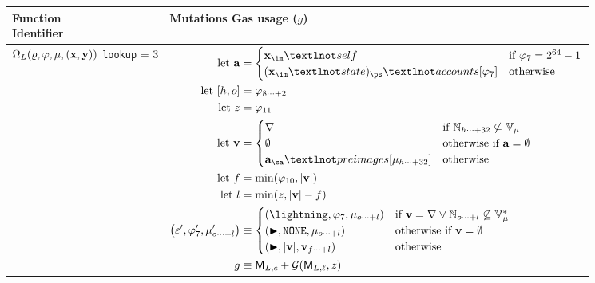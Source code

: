 \begin{longtable}{p{3cm} p{13cm}}
  \toprule
  \thead*{\textbf{Function} \\ \textbf{Identifier}} &
  \thead{\textbf{Mutations} \\ \textbf{Gas usage (}$g$\textbf{)}} \\
  \cmidrule(lr){1-1}\cmidrule(lr){2-2}
  \endhead
  \makecell*[l]{
  $\Omega_L(\gascounter, \registers, \memory, \imXY)$ \\
  \texttt{lookup} = 3} &
  $\begin{aligned}
    \using \mathbf{a} &= \begin{cases}
      \imX_\im¬self &\when \registers_7 = 2^{64} - 1 \\
      (\imX_\im¬state)_\ps¬accounts[\registers_7] &\otherwise
    \end{cases} \\
    \using \sq{h, o} &= \registers\subrange{8}{2} \\
    \using z &= \registers_{11} \\
    \using \mathbf{v} &= \begin{cases}
      \error &\when \Nrange{h}{32} \not\subseteq \readable{\memory} \\
      \none &\otherwhen \mathbf{a} = \none \\
      \mathbf{a}_\sa¬preimages[\memory\subrange{h}{32}] &\otherwise \\
    \end{cases} \\
    \using f &= \min(\registers_{10}, \len{\mathbf{v}}) \\
    \using l &= \min(z, \len{\mathbf{v}} - f) \\
    \tup{\execst', \registers'_7, \memory'\subrange{o}{l}} &\equiv \begin{cases}
      \tup{\panic, \registers_7, \memory\subrange{o}{l}} &\when \mathbf{v} = \error \vee \Nrange{o}{l} \not\subseteq \writable{\memory}\\
      \tup{\continue, \mathtt{NONE}, \memory\subrange{o}{l}} &\otherwhen \mathbf{v} = \none \\
      \tup{\continue, \len{\mathbf{v}}, \mathbf{v}\subrange{f}{l}} &\otherwise \\
    \end{cases} \\
    g &\equiv \CgasLconst + \fnmemgas(\CgasLlinear, z)
  \end{aligned}$\\
  \cmidrule(lr){1-1}\cmidrule(lr){2-2}

\end{longtable}
